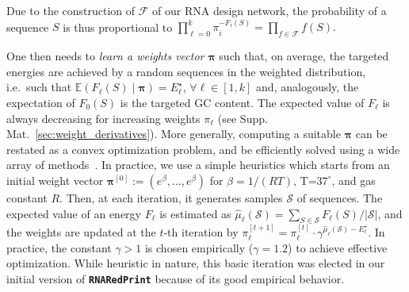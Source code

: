 \documentclass{bmcart}
\newcommand{\val}{\bar S} %
\newcommand{\F}{\mathcal{F}}
\newcommand{\Def}[1]{\emph{#1}}
\newcommand{\TargetE}{E^{\star}}
\newcommand{\ourprog}{{\tt \bfseries{}\color{black!85}RNA\textcolor{red!70!black}{Red}Print}}
\newcommand{\citep}[1]{\cite{#1}}
\begin{document}
Due to the construction of $\F$ of our RNA design network,
the probability of a sequence $S$ is thus proportional to
$\prod_{\ell=0}^{k} \pi_i^{-F_i(S)} = \prod_{f\in\F} f(S).$

One then needs to \Def{learn a weights vector} $\pmb{\pi}$ such that, on average, the targeted energies are achieved by a random sequences in the weighted distribution, i.e.\ such that  $\mathbb{E}(F_\ell(S)\mid \pmb{\pi})=\TargetE_\ell$,  $\forall\ell\in[1,k]$ and, analogously, the expectation of $F_0(S)$ is the targeted GC content.
The expected value of $F_\ell$ is always decreasing for increasing weights $\pi_\ell$ (see Supp. Mat.~\ref{sec:weight_derivatives}). More generally, computing a suitable $\pmb{\pi}$ can be restated as a convex optimization problem, and be efficiently solved using a wide array of methods~\citep{Denise2010,Bendkowski2017}.
In practice, we use a simple heuristics which starts from an initial weight vector $\pmb{\pi}^{[0]}:=(e^\beta,\dots,e^\beta)$ for $\beta=1/(RT)$, T=$37^\circ$, and gas constant $R$. Then, at each iteration, it generates samples $\mathcal{S}$ of sequences. The expected value of an energy $F_\ell$ is estimated as $\hat\mu_\ell(\mathcal{S}) = \sum_{S\in\mathcal{S}}F_\ell(S)/|\mathcal{S}|$, and the weights are updated at the $t$-th iteration by %
$\pi_\ell^{[t+1]} = \pi_\ell^{[t]}\cdot \gamma^{\hat\mu_\ell(\mathcal{S})-\TargetE_\ell}$. In practice, the constant $\gamma>1$ is chosen empirically  ($\gamma=1.2$) to achieve effective optimization.
While heuristic in nature, this basic iteration was elected in our initial version of \ourprog{} because of its good empirical behavior.
\end{document}
